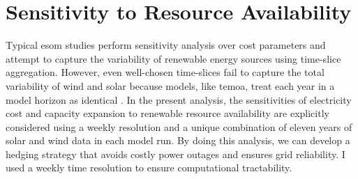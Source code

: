 \begin{table}[H]
  \centering
  \caption{Relative Difference in Total Capacity}
  \label{tab:relative_error}
\end{table}

\section{Sensitivity to Resource Availability}
\label{section:resource_sa}

Typical \gls{esom} studies perform sensitivity analysis over cost parameters and
attempt to capture the variability of renewable energy sources using time-slice
aggregation. However, even well-chosen time-slices fail to capture the total variability
of wind and solar because models, like \gls{temoa}, treat each year in a model
horizon as identical \cite{hunter_modeling_2013}. In the present analysis, the
sensitivities of electricity cost and capacity expansion to renewable resource
availability are explicitly considered using a weekly resolution and a unique combination
of eleven years of solar and wind data in each model run. By doing this analysis,
we can develop a hedging strategy that avoids costly power outages and ensures
grid reliability. I used a weekly time resolution to ensure computational tractability.

